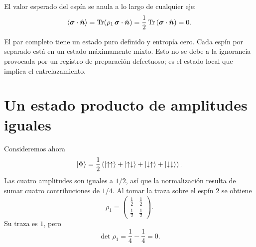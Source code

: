 El valor esperado del espín se anula a lo largo de cualquier eje:
\begin{equation}
\left\langle\bm{\sigma}\cdot\hat{\bm n}\right\rangle
=\operatorname{Tr}\!\left(
\rho_1\,\bm{\sigma}\cdot\hat{\bm n}
\right)
=\frac12\operatorname{Tr}
\left(\bm{\sigma}\cdot\hat{\bm n}\right)
=0.
\end{equation}

\begin{classroomqa}
\end{classroomqa}

El par completo tiene un estado puro definido y entropía cero. Cada espín por separado está en un estado máximamente mixto. Esto no se debe a la ignorancia provocada por un registro de preparación defectuoso; es el estado local que implica el entrelazamiento.

\section{Un estado producto de amplitudes iguales}

Consideremos ahora
\begin{equation}
\left\lvert\Phi\right\rangle
=\frac12\left(
\left\lvert\uparrow\uparrow\right\rangle
+\left\lvert\uparrow\downarrow\right\rangle
+\left\lvert\downarrow\uparrow\right\rangle
+\left\lvert\downarrow\downarrow\right\rangle
\right).
\end{equation}
Las cuatro amplitudes son iguales a \(1/2\), así que la normalización resulta de sumar cuatro contribuciones de \(1/4\). Al tomar la traza sobre el espín \(2\) se obtiene
\begin{equation}
\rho_1
=
\begin{pmatrix}
\frac12&\frac12\\[2pt]
\frac12&\frac12
\end{pmatrix}.
\end{equation}
Su traza es \(1\), pero
\begin{equation}
\det\rho_1
=\frac14-\frac14
=0.
\end{equation}

\begin{classroomqa}
\end{classroomqa}

